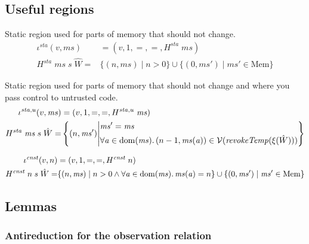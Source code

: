 \documentclass[a4paper]{article}
\newcommand{\union}{\mathbin{\cup}}
\DeclareMathOperator{\dom}{dom}
\newcommand{\var}[1]{\mathit{#1}}
\newcommand{\hs}{\var{ms}}
\newcommand{\ms}{\hs}
\newcommand{\addr}{\var{a}}
\newcommand{\sta}{\var{sta}}
\newcommand{\cnst}{\var{cnst}}
\newcommand{\plainfun}[2]{
  \ifthenelse{\equal{#2}{}}
  {\mathit{#1}}
  {\mathit{#1}(#2)}
}
\newcommand{\revokeTemp}[1]{\plainfun{revokeTemp}{#1}}
\newcommand{\asmType}{\plaindom{AsmType}}
\newcommand{\plaindom}[1]{\mathrm{#1}}
\newcommand{\Heaps}{\plaindom{Mem}}
\newcommand{\Mems}{\Heaps}
\newcommand{\intr}[2]{\mathcal{#1}}
\newcommand{\valueintr}[1]{\intr{V}{#1}}
\newcommand{\stdvr}{\valueintr{\asmType}}
\newcommand{\npair}[2][n]{\left(#1,#2 \right)}
\begin{document}
\subsection{Useful regions}
Static region used for parts of memory that should not change.
\begin{align*}
  \iota^\sta (v,\ms) &= (v,1,=,=,H^\sta\;\ms)\\
  H^\sta \; \ms \; s \; \hat{W} = & \{\npair{\ms} \mid n > 0 \} \union \{\npair[0]{\ms'} \mid \ms' \in \Mems \}
\end{align*}

Static region used for parts of memory that should not change and where you pass control to untrusted code.
\begin{align*}
  \iota^{\sta,u} (v,\ms) &= (v,1,=,=,H^{\sta,u}\;\ms)\\
  H^\sta \; \ms \; s \; \hat{W} = & \left\{\npair{\ms'} \middle|
    \begin{aligned}
      &\ms' = \ms \\
      &\forall \addr \in \dom(\ms) \ldotp \npair[n-1]{\ms(\addr)} \in \stdvr(\revokeTemp{\xi(\hat{W})})
    \end{aligned}
        \right\}
\end{align*}

\begin{align*}
  \iota^\cnst (v,n) &= (v,1,=,=,H^\cnst\;n)\\
  H^\cnst \; n \; s \; \hat{W} = &  \{\npair{\ms} \mid n > 0 \land \forall \addr \in \dom(\ms) \ldotp \ms(\addr) = n \} \union \{\npair[0]{\ms'} \mid \ms' \in \Mems \}
\end{align*}



\subsection{Lemmas}

\subsubsection{Antireduction for the observation relation}
\end{document}
